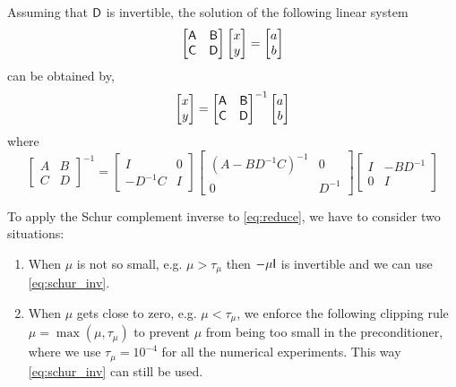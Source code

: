 \begin{remark}
Assuming that $\mathsf{D}$ is invertible, the solution of the following linear system 
\begin{equation*}
\begin{bmatrix}
\mathsf{A}  & \mathsf{B} \\
\mathsf{C}  & \mathsf{D} 
\end{bmatrix} 
\begin{bmatrix}
x \\ y
\end{bmatrix}
= 
\begin{bmatrix}
a \\ b
\end{bmatrix}
\end{equation*}
can be obtained by, 
\begin{equation*}
\begin{bmatrix}
x \\ y
\end{bmatrix}=
\begin{bmatrix}
\mathsf{A}  & \mathsf{B} \\
\mathsf{C}  & \mathsf{D} 
\end{bmatrix} ^{-1}
\begin{bmatrix}
a \\ b
\end{bmatrix}
\end{equation*}
where 
\begin{equation}\label{eq:schur_inv}
\begin{bmatrix}
A & B \\ C & D 
\end{bmatrix} ^{-1}
= \begin{bmatrix}
I  & 0 \\
-D^{-1}C  & I 
\end{bmatrix}
 \begin{bmatrix}
( A-BD^{-1}C )^{-1}   &  0 \\
 0   & D^{-1} 
\end{bmatrix}
\begin{bmatrix}
I  &   -BD^{-1} \\
0  &  I 
\end{bmatrix}
\end{equation}
\end{remark}
To apply the Schur complement inverse to \eqref{eq:reduce}, we have to consider two situations: 
\begin{enumerate}
\item When $\mu$ is not so small, e.g. $\mu > \tau_{\mu}$ then $- \mu \mathsf{I}$ is invertible and we can use \eqref{eq:schur_inv}. 
\item When $\mu$ gets close to zero, e.g. $\mu < \tau_{\mu}$, we enforce the following clipping rule $\mu = \max(\mu, \tau_{\mu}) $ 
to prevent $\mu$ from being too small in the preconditioner, where we use $\tau_{\mu} = 10^{-4}$ for all the numerical experiments. This way \eqref{eq:schur_inv} can still be used.
\end{enumerate}
